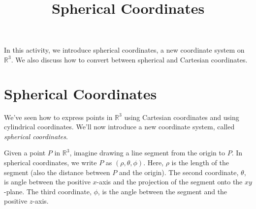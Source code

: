 \documentclass{ximera}
\title{Spherical Coordinates}
\begin{document}
\begin{abstract}
\end{abstract}
\maketitle

In this activity, we introduce spherical coordinates, a new coordinate system on $\mathbb{R}^3$. We also discuss how to convert between spherical and Cartesian coordinates.

\section*{Spherical Coordinates}

We've seen how to express points in $\mathbb{R}^3$ using Cartesian coordinates and using cylindrical coordinates. We'll now introduce a new coordinate system, called \emph{spherical coordinates}.

Given a point $P$ in $\mathbb{R}^3$, imagine drawing a line segment from the origin to $P$. In spherical coordinates, we write $P$ as $(\rho, \theta, \phi)$. Here, $\rho$ is the length of the segment (also the distance between $P$ and the origin). The second coordinate, $\theta$, is angle between the positive $x$-axis and the projection of the segment onto the $xy$-plane. The third coordinate, $\phi$, is the angle between the segment and the positive $z$-axis.
\end{document}
